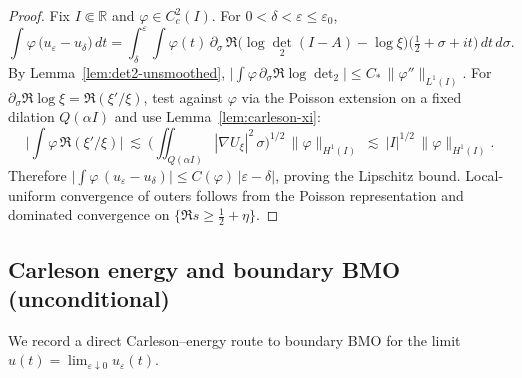 \documentclass[11pt]{article}
\theoremstyle{definition}
\theoremstyle{remark}
\newcommand{\R}{\mathbb{R}}
\begin{document}
\begin{proof}
Fix $I\Subset\R$ and $\varphi\in C_c^2(I)$. For $0<\delta<\varepsilon\le\varepsilon_0$,
\[\int \varphi\,\big(u_\varepsilon-u_\delta\big)\,dt = \int_\delta^{\varepsilon}\!\int \varphi(t)\,\partial_\sigma\,\Re\Big(\log\det_2(I-A)-\log\xi\Big)\big(\tfrac12+\sigma+it\big)\,dt\,d\sigma.\]
By Lemma~\ref{lem:det2-unsmoothed}, $\big|\int \varphi\,\partial_\sigma\Re\log\det_2\big|\le C_*\,\|\varphi''\|_{L^1(I)}$. For $\partial_\sigma\Re\log\xi=\Re(\xi'/\xi)$, test against $\varphi$ via the Poisson extension on a fixed dilation $Q(\alpha I)$ and use Lemma~\ref{lem:carleson-xi}:
\[\Big|\int \varphi\,\Re(\xi'/\xi)\Big|\ \lesssim\ \Big(\iint_{Q(\alpha I)} |\nabla U_\xi|^2\,\sigma\Big)^{1/2}\,\|\varphi\|_{H^1(I)}\ \lesssim\ |I|^{1/2}\,\|\varphi\|_{H^1(I)}.\]
Therefore $\big|\int \varphi\,(u_\varepsilon-u_\delta)\big|\le C(\varphi)\,|\varepsilon-\delta|$, proving the Lipschitz bound. Local-uniform convergence of outers follows from the Poisson representation and dominated convergence on $\{\Re s\ge\tfrac12+\eta\}$.
\end{proof}









\vspace{1.0cm}
\subsection*{Carleson energy and boundary BMO (unconditional)}
We record a direct Carleson–energy route to boundary BMO for the limit $u(t)=\lim_{\varepsilon\downarrow 0}u_\varepsilon(t)$.
\end{document}
